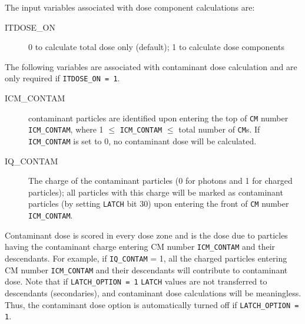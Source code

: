 \documentclass[12pt,twoside]{article}
\begin{document}
The input variables associated with dose component calculations are:
\begin{description}
\item [ITDOSE\_ON] 0 to calculate total dose only (default);
1 to calculate dose components
\end{description}


The following variables are associated with contaminant dose calculation
and are only required if  \verb+ITDOSE_ON = 1+.
\begin{description}
\item [ICM\_CONTAM] contaminant particles are identified upon entering
the top of \verb+CM+ number \verb+ICM_CONTAM+, where 1 $\leq$ \verb+ICM_CONTAM+
$\leq$ total number of \verb+CM+s.  If \verb+ICM_CONTAM+
is set to 0, no contaminant dose will be calculated.
\item [IQ\_CONTAM] The charge of the contaminant particles (0 for photons
and 1 for charged particles); all particles
with this charge will be marked as contaminant particles (by setting
\verb+LATCH+ bit 30)
upon entering the front of \verb+CM+ number \verb+ICM_CONTAM+.
\end{description}
Contaminant dose is scored in every dose zone and is the dose due to particles
having the contaminant charge entering CM number \verb+ICM_CONTAM+ and their
descendants. For example, if \verb+IQ_CONTAM+ = 1, all the charged particles
entering CM number \verb+ICM_CONTAM+ and their descendants will contribute to
contaminant dose. Note that if \verb+LATCH_OPTION = 1+
\verb+LATCH+ values are not transferred to descendants (secondaries),
and contaminant dose calculations will be
meaningless.  Thus, the contaminant dose option is automatically
turned off if \verb+LATCH_OPTION = 1+.
\end{document}
